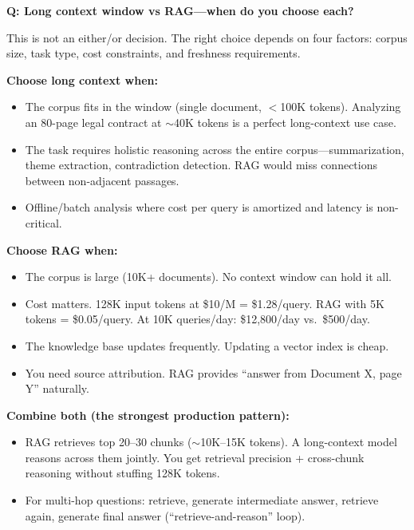 \begin{interviewq}
\textbf{Q: Long context window vs RAG---when do you choose each?}

 \quad {} \quad \badgefreq{\freqhigh}

\stronganswer

This is not an either/or decision. The right choice depends on four factors: corpus size, task type, cost constraints, and freshness requirements.

\textbf{Choose long context when:}
\begin{itemize}
    \item The corpus fits in the window (single document, $<$100K tokens). Analyzing an 80-page legal contract at $\sim$40K tokens is a perfect long-context use case.
    \item The task requires holistic reasoning across the entire corpus---summarization, theme extraction, contradiction detection. RAG would miss connections between non-adjacent passages.
    \item Offline/batch analysis where cost per query is amortized and latency is non-critical.
\end{itemize}

\textbf{Choose RAG when:}
\begin{itemize}
    \item The corpus is large (10K+ documents). No context window can hold it all.
    \item Cost matters. 128K input tokens at \$10/M = \$1.28/query. RAG with 5K tokens = \$0.05/query. At 10K queries/day: \$12,800/day vs.\ \$500/day.
    \item The knowledge base updates frequently. Updating a vector index is cheap.
    \item You need source attribution. RAG provides ``answer from Document X, page Y'' naturally.
\end{itemize}

\textbf{Combine both (the strongest production pattern):}
\begin{itemize}
    \item RAG retrieves top 20--30 chunks ($\sim$10K--15K tokens). A long-context model reasons across them jointly. You get retrieval precision + cross-chunk reasoning without stuffing 128K tokens.
    \item For multi-hop questions: retrieve, generate intermediate answer, retrieve again, generate final answer (``retrieve-and-reason'' loop).
\end{itemize}


\end{interviewq}
